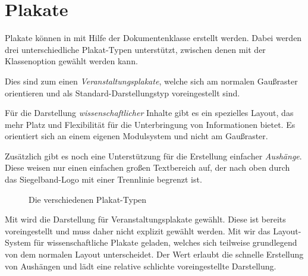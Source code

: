 \chapter{Plakate}

Plakate können in \tubslatex mit Hilfe der Dokumentenklasse  erstellt werden.
Dabei werden drei unterschiedliche Plakat-Typen unterstützt,
zwischen denen mit der Klassenoption  gewählt werden kann.

Dies sind zum einen \emph{Veranstaltungsplakate},
welche sich am normalen Gaußraster
orientieren und als Standard-Darstellungstyp voreingestellt sind.

Für die Darstellung \emph{wissenschaftlicher} Inhalte gibt es ein spezielles Layout,
das mehr Platz und Flexibilität für die Unterbringung von Informationen bietet.
Es orientiert sich an einem eigenen Modulsystem und nicht am Gaußraster.

Zusätzlich gibt es noch eine Unterstützung für die Erstellung einfacher
\emph{Aushänge}. Diese weisen nur einen einfachen großen Textbereich auf, der
nach oben durch das Siegelband-Logo mit einer Trennlinie begrenzt ist.

\begin{figure}[htp]\centering
{}
\begin{minipage}{0.32\textwidth}\centering
\end{minipage}
\begin{minipage}{0.32\textwidth}\centering
\end{minipage}
\begin{minipage}{0.32\textwidth}\centering
\end{minipage}
\caption{Die verschiedenen Plakat-Typen}
\end{figure}

\begin{Declaration}
\end{Declaration}

Mit  wird die Darstellung für Veranstaltungsplakate
gewählt. Diese ist bereits voreingestellt und muss daher nicht explizit gewählt
werden.
Mit  wir das Layout-System für wissenschaftliche Plakate
geladen, welches sich teilweise grundlegend von dem normalen Layout unterscheidet.
Der Wert  erlaubt die schnelle Erstellung von
Aushängen und lädt eine relative schlichte voreingestellte Darstellung.

